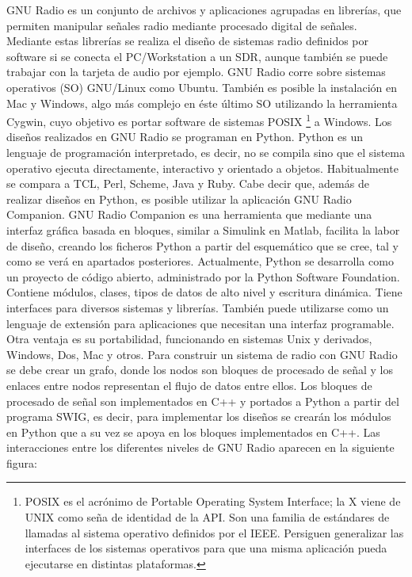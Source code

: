 GNU Radio es un conjunto de archivos y aplicaciones agrupadas en librerías, que permiten
manipular señales radio mediante procesado digital de señales. Mediante estas librerías se
realiza el diseño de sistemas radio definidos por software si se conecta el PC/Workstation a un SDR, aunque también se puede trabajar con la tarjeta de audio por ejemplo. GNU Radio corre sobre sistemas operativos (SO) GNU/Linux como Ubuntu. También es posible la instalación en Mac y Windows, algo más complejo en éste último SO utilizando la herramienta Cygwin, cuyo objetivo es portar software de sistemas POSIX \footnote{POSIX es el acrónimo de Portable Operating System Interface; la X viene de UNIX como seña de identidad de la API. Son una familia de estándares de llamadas al sistema operativo definidos por el IEEE.
Persiguen generalizar las interfaces de los sistemas operativos para que una misma aplicación pueda ejecutarse en distintas plataformas.}  a Windows.
Los diseños realizados en GNU Radio se programan en Python. Python es un lenguaje de
programación interpretado, es decir, no se compila sino que el sistema operativo ejecuta
directamente, interactivo y orientado a objetos. Habitualmente se compara a TCL, Perl, Scheme, Java y Ruby. Cabe decir que, además de realizar diseños en Python, es posible utilizar la aplicación GNU Radio Companion. GNU Radio Companion es una herramienta que mediante una interfaz gráfica basada en bloques, similar a Simulink en Matlab, facilita la labor de diseño, creando los ficheros Python a partir del esquemático que se cree, tal y como se verá en apartados posteriores.
Actualmente, Python se desarrolla como un proyecto de código abierto, administrado por la
Python Software Foundation. Contiene módulos, clases, tipos de datos de alto nivel y escritura dinámica. Tiene interfaces para diversos sistemas y librerías. También puede utilizarse como un lenguaje de extensión para aplicaciones que necesitan una interfaz programable. Otra ventaja es su portabilidad, funcionando en sistemas Unix y derivados, Windows, Dos, Mac y otros.
Para construir un sistema de radio con GNU Radio se debe crear un grafo, donde los nodos
son bloques de procesado de señal y los enlaces entre nodos representan el flujo de datos entre ellos. Los bloques de procesado de señal son implementados en C++ y portados a Python a partir del programa SWIG, es decir, para implementar los diseños se crearán los módulos en
Python que a su vez se apoya en los bloques implementados en C++. Las interacciones entre
los diferentes niveles de GNU Radio aparecen en la siguiente figura:

